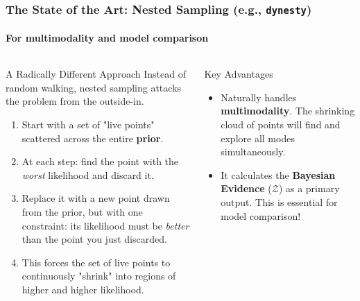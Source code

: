 \documentclass[aspectratio=169]{beamer}
\newcommand{\keyterm}[1]{\textbf{\textcolor{C0}{#1}}}
\begin{document}
\begin{frame}
    \frametitle{The State of the Art: Nested Sampling (e.g., \texttt{dynesty})}
    \framesubtitle{For multimodality and model comparison}
    
    \begin{columns}[T]
        \begin{block}{A Radically Different Approach}
            Instead of random walking, nested sampling attacks the problem from the outside-in.
            \begin{enumerate}
                \item Start with a set of "live points" scattered across the entire \keyterm{prior}.
                \item At each step: find the point with the \textit{worst} likelihood and discard it.
                \item Replace it with a new point drawn from the prior, but with one constraint: its likelihood must be \textit{better} than the point you just discarded.
                \item This forces the set of live points to continuously "shrink" into regions of higher and higher likelihood.
            \end{enumerate}
        \end{block}
        
        \begin{block}{Key Advantages}
            \begin{itemize}
                \item Naturally handles \keyterm{multimodality}. The shrinking cloud of points will find and explore all modes simultaneously.
                \item It calculates the \keyterm{Bayesian Evidence} ($\mathcal{Z}$) as a primary output. This is essential for model comparison!
            \end{itemize}
        \end{block}
        

\end{columns}
\end{frame}
\end{document}
